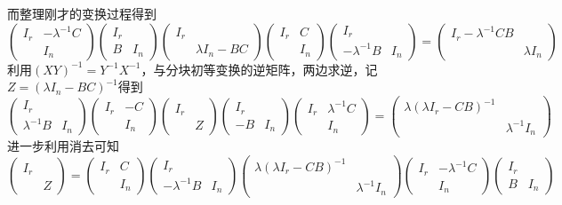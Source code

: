 \documentclass[a4paper,UTF8,fontset=windows]{ctexart}
\begin{document}
\begin{enumerate}
    而整理刚才的变换过程得到
    $$\begin{pmatrix}I_r&-\lambda^{-1}C\\ &I_n\end{pmatrix}\begin{pmatrix}I_r&\\B&I_n\end{pmatrix}\begin{pmatrix}I_r&\\ &\lambda I_n-BC\end{pmatrix}\begin{pmatrix}I_r&C\\ &I_n\end{pmatrix}\begin{pmatrix}I_r&\\-\lambda^{-1}B&I_n\end{pmatrix}=\begin{pmatrix}I_r-\lambda^{-1}CB&\\ &\lambda I_n\end{pmatrix}$$
    利用$(XY)^{-1}=Y^{-1}X^{-1}$，与分块初等变换的逆矩阵，两边求逆，记$Z=(\lambda I_n-BC)^{-1}$得到
    $$\begin{pmatrix}I_r&\\\lambda^{-1}B&I_n\end{pmatrix}\begin{pmatrix}I_r&-C\\ &I_n\end{pmatrix}\begin{pmatrix}I_r&\\ &Z\end{pmatrix}\begin{pmatrix}I_r&\\-B&I_n\end{pmatrix}\begin{pmatrix}I_r&\lambda^{-1}C\\ &I_n\end{pmatrix}=\begin{pmatrix}\lambda(\lambda I_r-CB)^{-1}&\\ &\lambda^{-1}I_n\end{pmatrix}$$
    进一步利用消去可知
    $$\begin{pmatrix}I_r&\\ &Z\end{pmatrix}=\begin{pmatrix}I_r&C\\ &I_n\end{pmatrix}\begin{pmatrix}I_r&\\-\lambda^{-1}B&I_n\end{pmatrix}\begin{pmatrix}\lambda(\lambda I_r-CB)^{-1}&\\ &\lambda^{-1}I_n\end{pmatrix}\begin{pmatrix}I_r&-\lambda^{-1}C\\ &I_n\end{pmatrix}\begin{pmatrix}I_r&\\B&I_n\end{pmatrix}$$

\end{enumerate}
\end{document}

